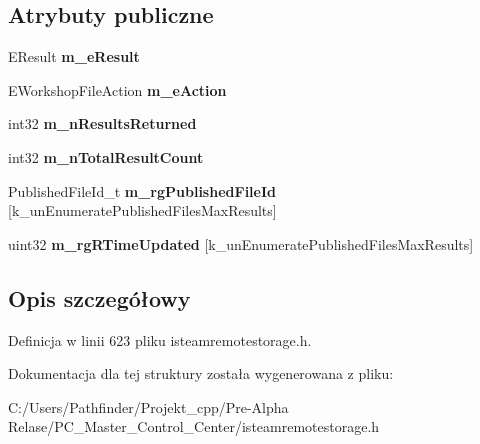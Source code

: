 \subsection*{Atrybuty publiczne}
\begin{DoxyCompactItemize}
\item 
\mbox{\label{struct_remote_storage_enumerate_published_files_by_user_action_result__t_abc80dd96ef0e5b9b6bb42d31c74cda31}} 
E\+Result {\bfseries m\+\_\+e\+Result}
\item 
\mbox{\label{struct_remote_storage_enumerate_published_files_by_user_action_result__t_ac8e52248508103b9644b370865410a08}} 
E\+Workshop\+File\+Action {\bfseries m\+\_\+e\+Action}
\item 
\mbox{\label{struct_remote_storage_enumerate_published_files_by_user_action_result__t_a818924d03ce6dea407db121b3d2d23f4}} 
int32 {\bfseries m\+\_\+n\+Results\+Returned}
\item 
\mbox{\label{struct_remote_storage_enumerate_published_files_by_user_action_result__t_ae57a4dd31cbe6dc576dfd1bcfd5e4ceb}} 
int32 {\bfseries m\+\_\+n\+Total\+Result\+Count}
\item 
\mbox{\label{struct_remote_storage_enumerate_published_files_by_user_action_result__t_a2577445d49de549883e331fcb5800261}} 
Published\+File\+Id\+\_\+t {\bfseries m\+\_\+rg\+Published\+File\+Id} \mbox{[}k\+\_\+un\+Enumerate\+Published\+Files\+Max\+Results\mbox{]}
\item 
\mbox{\label{struct_remote_storage_enumerate_published_files_by_user_action_result__t_a0d888a1386c0f3c5349b64a3cc267766}} 
uint32 {\bfseries m\+\_\+rg\+R\+Time\+Updated} \mbox{[}k\+\_\+un\+Enumerate\+Published\+Files\+Max\+Results\mbox{]}
\end{DoxyCompactItemize}


\subsection{Opis szczegółowy}


Definicja w linii 623 pliku isteamremotestorage.\+h.



Dokumentacja dla tej struktury została wygenerowana z pliku\+:\begin{DoxyCompactItemize}
\item 
C\+:/\+Users/\+Pathfinder/\+Projekt\+\_\+cpp/\+Pre-\/\+Alpha Relase/\+P\+C\+\_\+\+Master\+\_\+\+Control\+\_\+\+Center/isteamremotestorage.\+h\end{DoxyCompactItemize}
